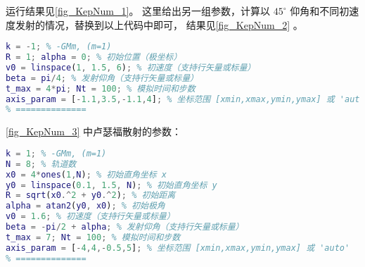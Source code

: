 运行结果见\autoref{fig_KepNum_1}。 这里给出另一组参数，计算以 $45^\circ$ 仰角和不同初速度发射的情况，替换到以上代码中即可， 结果见\autoref{fig_KepNum_2} 。
\begin{lstlisting}[language=matlab]
% === 参数设置 ===
k = -1; % -GMm, (m=1)
R = 1; alpha = 0; % 初始位置（极坐标）
v0 = linspace(1, 1.5, 6); % 初速度（支持行矢量或标量）
beta = pi/4; % 发射仰角（支持行矢量或标量）
t_max = 4*pi; Nt = 100; % 模拟时间和步数
axis_param = [-1.1,3.5,-1.1,4]; % 坐标范围 [xmin,xmax,ymin,ymax] 或 'auto'
% ==============
\end{lstlisting}

\autoref{fig_KepNum_3} 中卢瑟福散射的参数：
\begin{lstlisting}[language=matlab]
% === 参数设置 ===
k = 1; % -GMm, (m=1)
N = 8; % 轨道数
x0 = 4*ones(1,N); % 初始直角坐标 x
y0 = linspace(0.1, 1.5, N); % 初始直角坐标 y
R = sqrt(x0.^2 + y0.^2); % 初始距离
alpha = atan2(y0, x0); % 初始极角
v0 = 1.6; % 初速度（支持行矢量或标量）
beta = -pi/2 + alpha; % 发射仰角（支持行矢量或标量）
t_max = 7; Nt = 100; % 模拟时间和步数
axis_param = [-4,4,-0.5,5]; % 坐标范围 [xmin,xmax,ymin,ymax] 或 'auto'
% ==============
\end{lstlisting}
